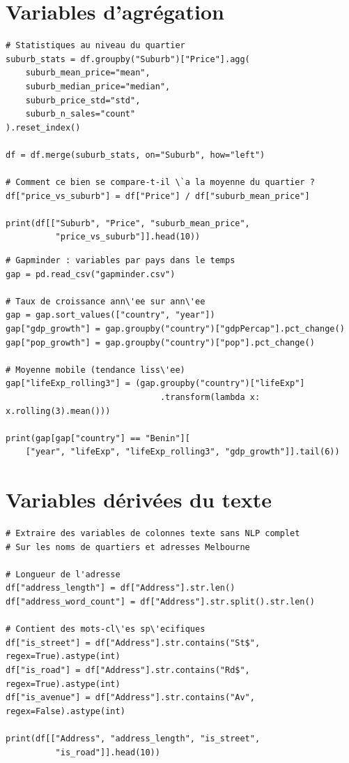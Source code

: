 \section{Variables d'agr\'egation}

\begin{verbatim}
# Statistiques au niveau du quartier
suburb_stats = df.groupby("Suburb")["Price"].agg(
    suburb_mean_price="mean",
    suburb_median_price="median",
    suburb_price_std="std",
    suburb_n_sales="count"
).reset_index()

df = df.merge(suburb_stats, on="Suburb", how="left")

# Comment ce bien se compare-t-il \`a la moyenne du quartier ?
df["price_vs_suburb"] = df["Price"] / df["suburb_mean_price"]

print(df[["Suburb", "Price", "suburb_mean_price",
          "price_vs_suburb"]].head(10))
\end{verbatim}

\begin{verbatim}
# Gapminder : variables par pays dans le temps
gap = pd.read_csv("gapminder.csv")

# Taux de croissance ann\'ee sur ann\'ee
gap = gap.sort_values(["country", "year"])
gap["gdp_growth"] = gap.groupby("country")["gdpPercap"].pct_change()
gap["pop_growth"] = gap.groupby("country")["pop"].pct_change()

# Moyenne mobile (tendance liss\'ee)
gap["lifeExp_rolling3"] = (gap.groupby("country")["lifeExp"]
                               .transform(lambda x: x.rolling(3).mean()))

print(gap[gap["country"] == "Benin"][
    ["year", "lifeExp", "lifeExp_rolling3", "gdp_growth"]].tail(6))
\end{verbatim}

\section{Variables d\'eriv\'ees du texte}

\begin{verbatim}
# Extraire des variables de colonnes texte sans NLP complet
# Sur les noms de quartiers et adresses Melbourne

# Longueur de l'adresse
df["address_length"] = df["Address"].str.len()
df["address_word_count"] = df["Address"].str.split().str.len()

# Contient des mots-cl\'es sp\'ecifiques
df["is_street"] = df["Address"].str.contains("St$", regex=True).astype(int)
df["is_road"] = df["Address"].str.contains("Rd$", regex=True).astype(int)
df["is_avenue"] = df["Address"].str.contains("Av", regex=False).astype(int)

print(df[["Address", "address_length", "is_street",
          "is_road"]].head(10))
\end{verbatim}

